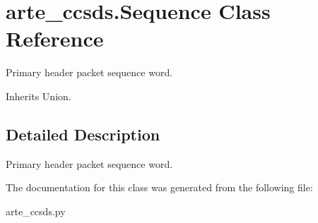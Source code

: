 \section{arte\+\_\+ccsds.\+Sequence Class Reference}
\label{classarte__ccsds_1_1_sequence}


Primary header packet sequence word.  




Inherits Union.



\subsection{Detailed Description}
Primary header packet sequence word. 



The documentation for this class was generated from the following file\+:\begin{DoxyCompactItemize}
\item 
arte\+\_\+ccsds.\+py\end{DoxyCompactItemize}

